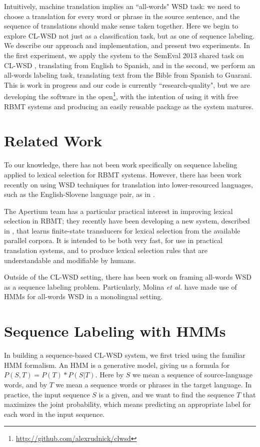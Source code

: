 \documentclass[11pt]{article}
\begin{document}
Intuitively, machine translation implies an ``all-words" WSD task: we need to
choose a translation for every word or phrase in the source sentence, and the
sequence of translations should make sense taken together. Here we begin to
explore CL-WSD not just as a classification task, but as one of sequence
labeling. We describe our approach and implementation, and present two
experiments. In the first experiment, we apply the system to the SemEval 2013
shared task on CL-WSD \cite{task10}, translating from English to Spanish, and
in the second, we perform an all-words labeling task, translating text from the
Bible from Spanish to Guarani. This is work in progress and our code is
currently ``research-quality", but we are developing the software in the
open\footnote{\url{http://github.com/alexrudnick/clwsd}}, with the intention of
using it with free RBMT systems and producing an easily reusable package as the
system matures.

\section{Related Work}
To our knowledge, there has not been work specifically on sequence labeling
applied to lexical selection for RBMT systems. However, 
there has been work recently on using WSD techniques for translation into
lower-resourced languages, such as the English-Slovene language pair, as in 
\cite{vintar-fivser-vrvsvcaj:2012:ESIRMT-HyTra2012}. 

The Apertium team has a particular practical interest in improving lexical
selection in RBMT; they recently have been developing
a new system, described in \cite{tyers-fst}, that learns finite-state
transducers for lexical selection from the available parallel corpora. It is
intended to be both very fast, for use in practical translation systems, and
to produce lexical selection rules that are understandable and modifiable by
humans.

Outside of the CL-WSD setting, there has been work on framing all-words WSD as
a sequence labeling problem. Particularly, Molina \textit{et al.}
 have made use of HMMs for all-words
WSD in a monolingual setting.

\section{Sequence Labeling with HMMs}
In building a sequence-based CL-WSD system, we first tried using the familiar
HMM formalism. An HMM is a generative model, giving us a formula for $P(S, T) =
P(T) * P(S|T)$. Here by $S$ we mean a sequence of source-language words, and by
$T$ we mean a sequence words or phrases in the target language. In practice,
the input sequence $S$ is a given, and we want to find the sequence $T$ that
maximizes the joint probability, which means predicting an appropriate label
for each word in the input sequence.
\end{document}
